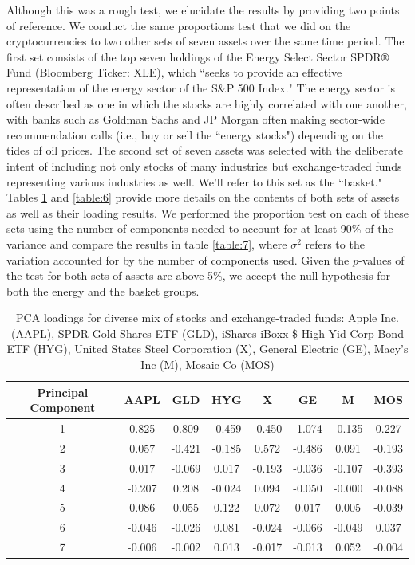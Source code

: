 \documentclass[12pt,twoside]{article}
\newcommand{\head}[1]{\textnormal{\textbf{#1}}}
\begin{document}
\bigbreak
Although this was a rough test, we elucidate the results by providing two points of reference. We conduct the same proportions test that we did on the cryptocurrencies to two other sets of seven assets over the same time period. The first set consists of the top seven holdings of the Energy Select Sector SPDR® Fund (Bloomberg Ticker: XLE), which ``seeks to provide an effective representation of the energy sector of the S\&P 500 Index." The energy sector is often described as one in which the stocks are highly correlated with one another, with banks such as Goldman Sachs and JP Morgan often making sector-wide recommendation calls (i.e., buy or sell the ``energy stocks") depending on the tides of oil prices. The second set of seven assets was selected with the deliberate intent of including not only stocks of many industries but exchange-traded funds representing various industries as well. We'll refer to this set as the ``basket." Tables \ref{table:loadings_bsk} and \ref{table:6} provide more details on the contents of both sets of assets as well as their loading results. We performed the proportion test on each of these sets using the number of components needed to account for at least 90\% of the variance and compare the results in table \ref{table:7}, where $\sigma^2$ refers to the variation accounted for by the number of components used. Given the $p$-values of the test for both sets of assets are above 5\%, we accept the null hypothesis for both the energy and the basket groups.

\begin{table}[h!]
	\centering
	\begin{tabular}{cccccccc}
		\toprule
		\head{Principal Component} & \head{AAPL} & \head{GLD} & \head{HYG} &      \head{X} & \head{GE} & \head{M} & \head{MOS} \\
		\midrule
		1         &  0.825 &  0.809 & -0.459 & -0.450 & -1.074 & -0.135 &  0.227 \\
		2         &  0.057 & -0.421 & -0.185 &  0.572 & -0.486 &  0.091 & -0.193 \\
		3         &  0.017 & -0.069 &  0.017 & -0.193 & -0.036 & -0.107 & -0.393 \\
		4         & -0.207 &  0.208 & -0.024 &  0.094 & -0.050 & -0.000 & -0.088 \\
		5         &  0.086 &  0.055 &  0.122 &  0.072 &  0.017 &  0.005 & -0.039 \\
		6         & -0.046 & -0.026 &  0.081 & -0.024 & -0.066 & -0.049 &  0.037 \\
		7         & -0.006 & -0.002 &  0.013 & -0.017 & -0.013 &  0.052 & -0.004 \\
		\bottomrule
	\end{tabular}
	\caption{PCA loadings for diverse mix of stocks and exchange-traded funds: Apple Inc. (AAPL), SPDR Gold Shares ETF (GLD),  iShares iBoxx \$ High Yid Corp Bond ETF (HYG), United States Steel Corporation (X), General Electric (GE), Macy's Inc (M), Mosaic Co (MOS) }
	\label{table:loadings_bsk}
\end{table}
\end{document}
